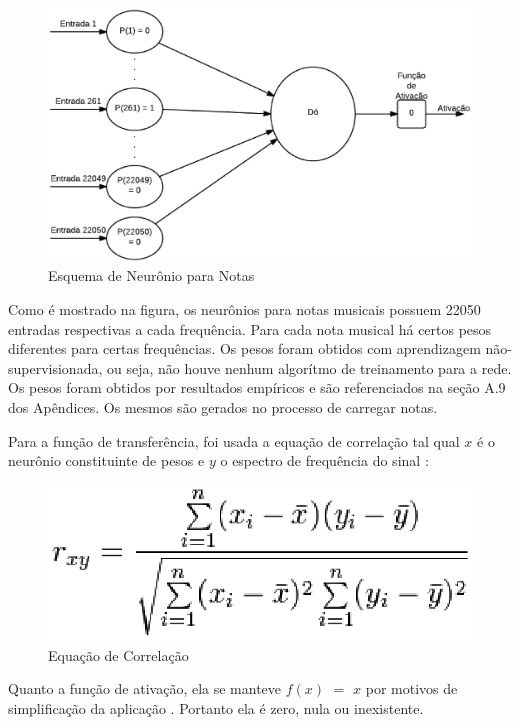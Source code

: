 \begin{figure}[h]
	\centering
		\includegraphics[keepaspectratio=true,scale=0.41]{figuras/neuron_notes}
	\caption{Esquema de Neurônio para Notas}
\end{figure}

Como é mostrado na figura, os neurônios para notas musicais possuem 22050 entradas respectivas a cada frequência. Para cada nota musical há certos pesos diferentes para certas frequências. Os pesos foram obtidos com aprendizagem não-supervisionada, ou seja, não houve nenhum algorítmo de treinamento para a rede. Os pesos foram obtidos por resultados empíricos e são referenciados na seção A.9 dos Apêndices. Os mesmos são gerados no processo de carregar notas.

Para a função de transferência, foi usada a equação de correlação tal qual $x$ é o neurônio constituinte de pesos e $y$ o espectro de frequência do sinal \cite{correlacao}:

\begin{figure}[h]
	\centering
		\includegraphics[keepaspectratio=true,scale=0.7]{figuras/correlation-formula}
	\caption{Equação de Correlação}
\end{figure}

Quanto a função de ativação, ela se manteve $f(x)$ $=$ $x$ por motivos de simplificação da aplicação
. Portanto ela é zero, nula ou inexistente.

